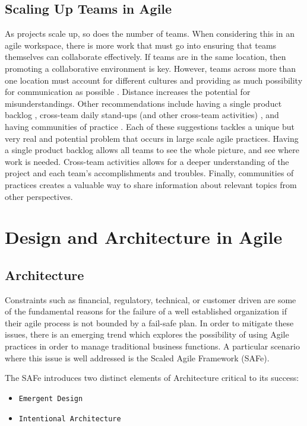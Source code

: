 \documentclass[sigplan,screen]{acmart}
\begin{document}
\subsection{Scaling Up Teams in Agile}
As projects scale up, so does the number of teams. When considering this in an agile workspace, there is more work that must go into ensuring that teams themselves can collaborate effectively. If teams are in the same location, then promoting a collaborative environment is key. However, teams across more than one location must account for different cultures and providing as much possibility for communication as possible \cite{Joshi12}. Distance increases the potential for misunderstandings. Other recommendations include having a single product backlog \cite{Zalavadia16}, cross-team daily stand-ups (and other cross-team activities) \cite{GSATech}, and having communities of practice \cite{Crocker18}. Each of these suggestions tackles a unique but very real and potential problem that occurs in large scale agile practices. Having a single product backlog allows all teams to see the whole picture, and see where work is needed. Cross-team activities allows for a deeper understanding of the project and each team's accomplishments and troubles. Finally, communities of practices creates a valuable way to share information about relevant topics from other perspectives.

\section{Design and Architecture in Agile}
\subsection{Architecture}

Constraints such as financial, regulatory, technical, or customer driven are some of the fundamental reasons for the failure of a well established organization if their agile process is not bounded by a fail-safe plan. In order to mitigate these issues, there is an emerging trend which explores the possibility of using Agile practices in order to manage traditional business functions.  \cite{SoftArchAgile} A particular scenario where this issue is well addressed is the Scaled Agile Framework (SAFe).

The SAFe introduces two distinct elements of Architecture critical to its success:
\begin{itemize}
\item {\verb|Emergent Design|}
\item {\verb|Intentional Architecture|}
\end{itemize}
\end{document}
